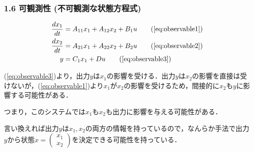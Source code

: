 \begin{frame}[t]
\frametitle{1.6 可観測性 (不可観測な状態方程式)}
\begin{align}
 \frac{dx_1}{dt} &= A_{11} x_1 + A_{12} x_2 + B_1 u
\tag{\ref{eq:observable1}} \\
 \frac{dx_2}{dt} &= A_{21} x_1 + A_{22} x_2 + B_2 u
\tag{\ref{eq:observable2}} \\
 y & = C_1 x_1 + Du
\tag{\ref{eq:observable3}}
\end{align}

(\ref{eq:observable3})より，出力$y$は$x_1$の影響を受ける．出力$y$は$x_2$の影響を直接は受けないが，(\ref{eq:observable1})より$x_1$が$x_2$の影響を受けるため，間接的に$x_2$も$y$に影響する可能性がある．

つまり，このシステムでは$x_1$も$x_2$も出力に影響を与える可能性がある．

言い換えれば出力$y$は$x_1,x_2$の両方の情報を持っているので，なんらか手法で出力$y$から状態$x = \left(\begin{array}{c} {x}_1 \\ {x}_2 \end{array}\right)$を決定できる可能性を持っている．
\end{frame}


